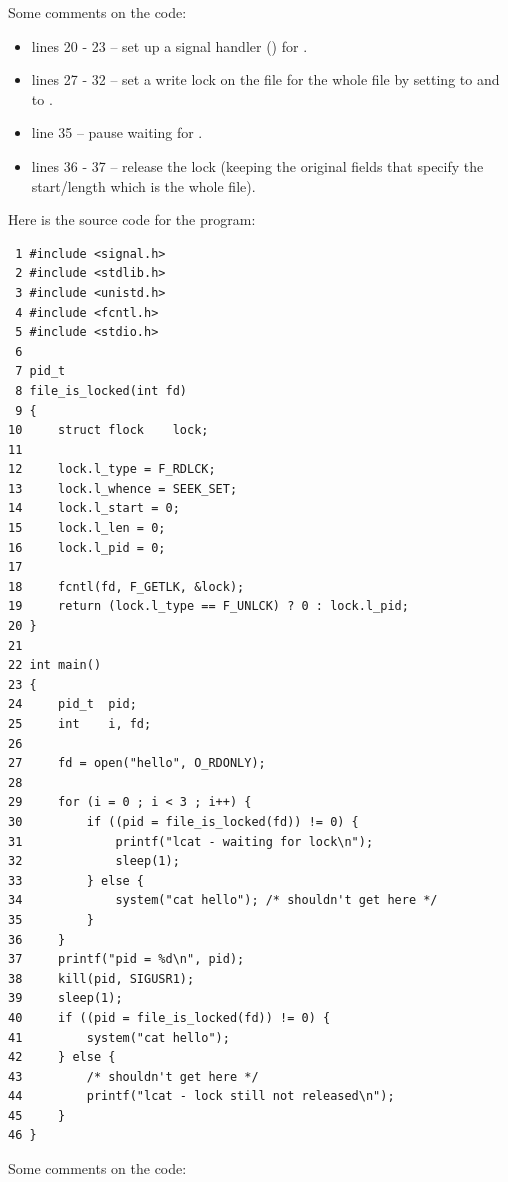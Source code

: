 \noindent
Some comments on the code:

\begin{itemize}
	\item lines 20 - 23 -- set up a signal handler () for .
	\item lines 27 - 32 -- set a write lock on the file for the whole file by setting  to  and  to . 
	\item line 35 -- pause waiting for .
	\item lines 36 - 37 -- release the lock (keeping the original fields that specify the start/length which is the whole file).
\end{itemize}

\noindent
Here is the source code for the  program:

\begin{lstlisting}
 1 #include <signal.h>
 2 #include <stdlib.h>
 3 #include <unistd.h>
 4 #include <fcntl.h>
 5 #include <stdio.h>
 6 
 7 pid_t
 8 file_is_locked(int fd)
 9 {
10     struct flock    lock;
11 
12     lock.l_type = F_RDLCK;
13     lock.l_whence = SEEK_SET;
14     lock.l_start = 0;
15     lock.l_len = 0;
16     lock.l_pid = 0;
17 
18     fcntl(fd, F_GETLK, &lock);
19     return (lock.l_type == F_UNLCK) ? 0 : lock.l_pid;
20 }
21 
22 int main()
23 {
24     pid_t  pid;
25     int    i, fd;
26 
27     fd = open("hello", O_RDONLY);
28 
29     for (i = 0 ; i < 3 ; i++) {
30         if ((pid = file_is_locked(fd)) != 0) {
31             printf("lcat - waiting for lock\n");
32             sleep(1);
33         } else {
34             system("cat hello"); /* shouldn't get here */
35         }
36     }
37     printf("pid = %d\n", pid);
38     kill(pid, SIGUSR1);
39     sleep(1);
40     if ((pid = file_is_locked(fd)) != 0) {
41         system("cat hello");
42     } else {
43         /* shouldn't get here */
44         printf("lcat - lock still not released\n");
45     }
46 }
\end{lstlisting}

\noindent
Some comments on the code:

